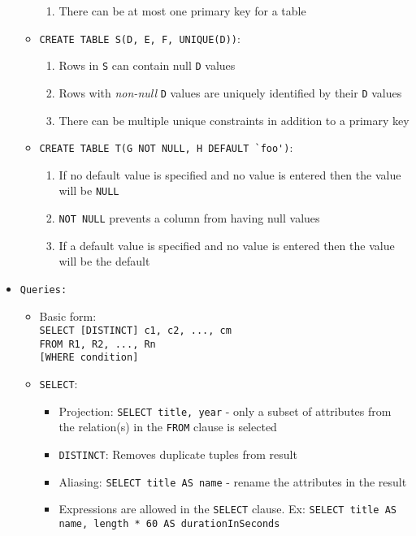 \documentclass[landscape,8pt]{extarticle}
\newcommand{\code}{\lstinline}
\begin{document}
\begin{multicols}{4}
\begin{itemize}
\begin{itemize}
\begin{enumerate}
        \item There can be at most one primary key for a table
        \end{enumerate}
        \item \code{CREATE TABLE S(D, E, F, UNIQUE(D))}:
        \begin{enumerate}
            \item Rows in \code{S} can contain null \code{D} values
            \item Rows with \emph{non-null} \code{D} values are uniquely identified by their \code{D} values
            \item There can be multiple unique constraints in addition to a primary key
        \end{enumerate}
        \item \code{CREATE TABLE T(G NOT NULL, H DEFAULT `foo')}:
        \begin{enumerate}
            \item If no default value is specified and no value is entered then the value will be \code{NULL}
            \item \code{NOT NULL} prevents a column from having null values
            \item If a default value is specified and no value is entered then the value will be the
            default
        \end{enumerate}
    \end{itemize}
    \item \code{Queries:}
    \begin{itemize}
        \item Basic form: \\
\code{SELECT [DISTINCT] c1, c2, ..., cm} \\
\code{FROM R1, R2, ..., Rn} \\
\code{[WHERE condition]}
    \item \code{SELECT}:
    \begin{itemize}
        \item Projection: \code{SELECT title, year} - only a subset of attributes from the
        relation(s) in the \code{FROM} clause is selected
        \item \code{DISTINCT}: Removes duplicate tuples from result
        \item Aliasing: \code{SELECT title AS name} - rename the attributes in the result
        \item Expressions are allowed in the \code{SELECT} clause. Ex: \code{SELECT title AS name, length * 60 AS durationInSeconds}

\end{itemize}
\end{itemize}
\end{itemize}
\end{multicols}
\end{document}
